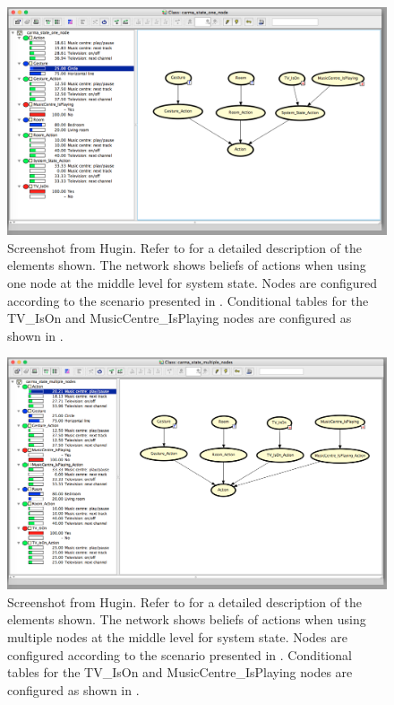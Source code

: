 \begin{figure}[h!]
\centering
\includegraphics[width=\textwidth]{images/system-state-one-6}
\caption{Screenshot from Hugin. Refer to  for a detailed description of the elements shown. The network shows beliefs of actions when using one node at the middle level for system state. Nodes are configured according to the scenario presented in . Conditional tables for the TV\_IsOn and MusicCentre\_IsPlaying nodes are configured as shown in .}
\label{fig:design:bayesian-network:system-state-one-6}
\end{figure}

\begin{figure}[h!]
\centering
\includegraphics[width=\textwidth]{images/system-state-multiple-6}
\caption{Screenshot from Hugin. Refer to  for a detailed description of the elements shown. The network shows beliefs of actions when using multiple nodes at the middle level for system state. Nodes are configured according to the scenario presented in . Conditional tables for the TV\_IsOn and MusicCentre\_IsPlaying nodes are configured as shown in .}
\label{fig:design:bayesian-network:system-state-multiple-6}
\end{figure}





